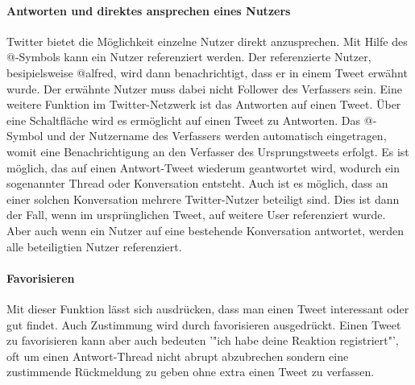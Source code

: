 \paragraph{Antworten und direktes ansprechen eines Nutzers}
					Twitter bietet die Möglichkeit einzelne Nutzer direkt anzusprechen. 
					Mit Hilfe des @-Symbols kann ein Nutzer referenziert werden. 
					Der referenzierte Nutzer, besipielsweise @alfred, wird dann benachrichtigt, dass er in einem Tweet erwähnt wurde. 
					Der erwähnte Nutzer muss dabei nicht Follower des Verfassers sein.  
					Eine weitere Funktion im Twitter-Netzwerk ist das Antworten auf einen Tweet.
					Über eine Schaltfläche wird es ermöglicht auf einen Tweet zu Antworten. 
					Das @-Symbol und der Nutzername des Verfassers werden automatisch eingetragen, womit eine Benachrichtigung an den Verfasser des Ursprungstweets erfolgt. 
					Es ist möglich, das auf einen Antwort-Tweet wiederum geantwortet wird, wodurch ein sogenannter Thread oder Konversation entsteht. 
					Auch ist es möglich, dass an einer solchen Konversation mehrere Twitter-Nutzer beteiligt sind. 
					Dies ist dann der Fall, wenn im ursprünglichen Tweet, auf weitere User referenziert wurde. 
					Aber auch wenn ein Nutzer auf eine bestehende Konversation antwortet, werden alle beteiligtien Nutzer referenziert. 


				\paragraph{Favorisieren}
					Mit dieser Funktion lässt sich ausdrücken, dass man einen Tweet interessant oder gut findet.
					Auch Zustimmung wird durch favorisieren ausgedrückt.  
					Einen Tweet zu favorisieren kann aber auch bedeuten '"ich habe deine Reaktion registriert"', oft um einen Antwort-Thread nicht abrupt abzubrechen sondern eine zustimmende Rückmeldung zu geben ohne extra einen Tweet zu verfassen.
